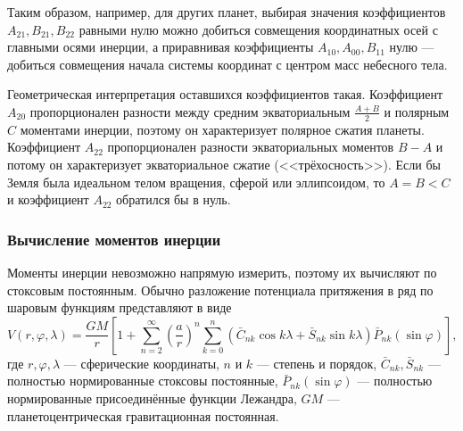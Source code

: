 \documentclass[11pt, a4paper,addpoints]{exam}
\theoremstyle{remark}
\renewcommand{\phi}{\ensuremath{\varphi}}
\begin{document}
    Таким образом, например, для других планет, выбирая значения коэффициентов $A_{21}, B_{21},
    B_{22}$ равными нулю можно добиться совмещения координатных осей с главными осями инерции, а
    приравнивая коэффициенты $A_{10}, A_{00}, B_{11}$ нулю --- добиться совмещения начала системы координат с
    центром масс небесного тела.

    Геометрическая интерпретация оставшихся коэффициентов такая. Коэффициент $A_{20}$ пропорционален
    разности между средним экваториальным $\frac{A+B}{2}$ и полярным
    $C$ моментами инерции, поэтому он характеризует полярное сжатия планеты. Коэффициент
    $A_{22}$ пропорционален разности экваториальных моментов $B-A$ и потому он характеризует
    экваториальное сжатие (<<трёхосность>>). Если бы Земля была идеальном телом вращения, сферой или
    эллипсоидом, то $A = B < C$ и коэффициент $A_{22}$ обратился бы в нуль.

    \subsubsection*{Вычисление моментов инерции}
    Моменты инерции невозможно напрямую измерить, поэтому их вычисляют по стоксовым
    постоянным. Обычно разложение потенциала притяжения в ряд по шаровым функциям представляют в виде
    \begin{equation}
        V \left( r, \phi, \lambda \right) = \dfrac{GM}{r} \left[ 1 +  
            \sum\limits_{n=2}^{\infty} \left( \dfrac{a}{r} \right)^n
        \sum\limits_{k=0}^{n} \left(  
        \bar{C}_{nk}\cos{k\lambda} + \bar{S}_{nk}\sin{k\lambda}
        \right) \bar{P}_{nk} \left( \sin{\phi} \right)\right],
    \end{equation}
    где $r, \phi, \lambda$ --- сферические координаты, $n$ и $k$ --- степень и порядок,
    $\bar{C}_{nk},\bar{S}_{nk}$ --- полностью нормированные стоксовы постоянные, 
    $\bar{P}_{nk}\left( \sin{\phi} \right)$ --- полностью нормированные присоединённые функции
    Лежандра, $GM$ --- планетоцентрическая гравитационная постоянная.
\end{document}
